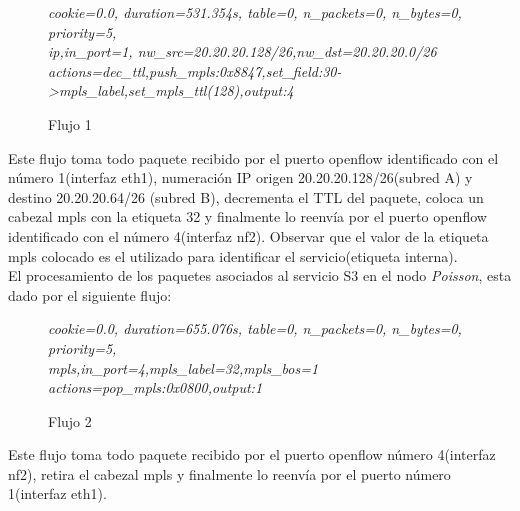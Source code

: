 
\begin{figure}[h]
\textit{cookie=0.0, duration=531.354s, table=0, n\_packets=0, n\_bytes=0, priority=5, \\
ip,in\_port=1, nw\_src=20.20.20.128/26,nw\_dst=20.20.20.0/26 \\
actions=dec\_ttl,push\_mpls:0x8847,set\_field:30->mpls\_label,set\_mpls\_ttl(128),output:4}
\centering
\caption{Flujo 1}
\label{fig:Flujo1}
\end{figure}

Este flujo toma todo paquete recibido por el puerto openflow identificado con el n\'umero 1(interfaz eth1), numeración IP origen 20.20.20.128/26(subred A) y destino 20.20.20.64/26 (subred B), decrementa el TTL del paquete, coloca un cabezal mpls con la etiqueta 32 y finalmente lo reenvía por el puerto openflow identificado con el n\'umero 4(interfaz nf2). Observar que el valor de la etiqueta mpls colocado es el utilizado para identificar el servicio(etiqueta interna). \\


El procesamiento de los paquetes asociados al servicio S3 en el nodo \textit{Poisson}, esta dado por el siguiente flujo:

\begin{figure}[h]
\textit{cookie=0.0, duration=655.076s, table=0, n\_packets=0, n\_bytes=0, priority=5, \\
mpls,in\_port=4,mpls\_label=32,mpls\_bos=1 \\
actions=pop\_mpls:0x0800,output:1 }
\centering
\caption{Flujo 2}
\label{fig:Flujo2}
\end{figure}

Este flujo toma todo paquete recibido por el puerto openflow n\'umero 4(interfaz nf2), retira el cabezal mpls y finalmente lo reenvía por el puerto n\'umero 1(interfaz eth1).\\

